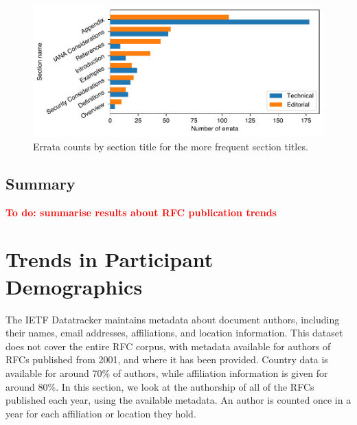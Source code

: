 \documentclass[twocolumn,10pt]{article}
\newlength{\figureWidthOneColumn}
\newcommand{\todo}[1]{\textbf{\textcolor{red}{To do: #1}}}
\begin{document}
\begin{figure}
  \centering
  \includegraphics[width=\figureWidthOneColumn]{figures-prev/tma-2023/section-title-counts.pdf}
  \caption{
    Errata counts by section title for the more frequent section titles.
  }
  \label{fig:errata_section_wise_counts}
\end{figure}

\subsection{Summary}

\todo{summarise results about RFC publication trends}

\section{Trends in Participant Demographics}



The IETF Datatracker maintains metadata about document authors, including
their names, email addresses, affiliations, and location information. This
dataset does not cover the entire RFC corpus, with metadata available for
authors of RFCs published from 2001, and where it has been provided.
Country data is available for around 70\% of authors, while affiliation
information is given for around 80\%. In this section, we look at the
authorship of all of the RFCs published each year, using the available
metadata. An author is counted once in a year for each affiliation or
location they hold.

\end{document}
